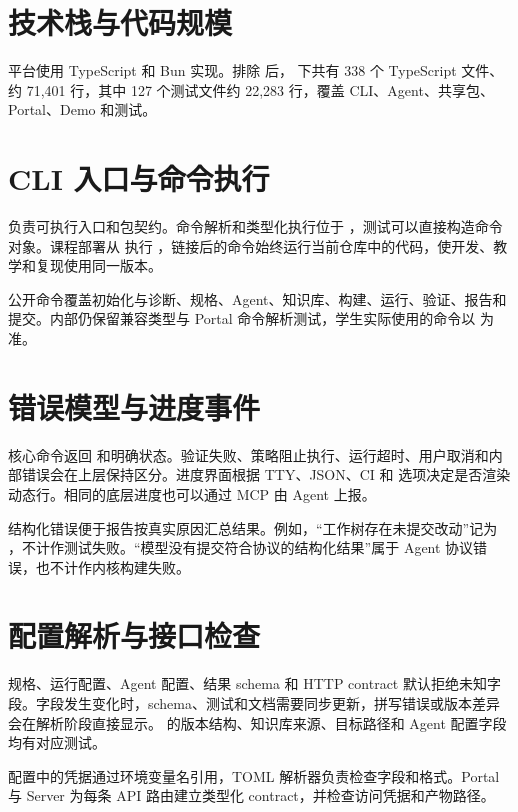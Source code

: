 \section{技术栈与代码规模}

平台使用 TypeScript 和 Bun 实现。排除  后， 下共有 338 个 TypeScript 文件、约 71,401 行，其中 127 个测试文件约 22,283 行，覆盖 CLI、Agent、共享包、Portal、Demo 和测试。

\section{CLI 入口与命令执行}

 负责可执行入口和包契约。命令解析和类型化执行位于 ，测试可以直接构造命令对象。课程部署从  执行 ，链接后的命令始终运行当前仓库中的代码，使开发、教学和复现使用同一版本。

公开命令覆盖初始化与诊断、规格、Agent、知识库、构建、运行、验证、报告和提交。内部仍保留兼容类型与 Portal 命令解析测试，学生实际使用的命令以  为准。

\section{错误模型与进度事件}

核心命令返回  和明确状态。验证失败、策略阻止执行、运行超时、用户取消和内部错误会在上层保持区分。进度界面根据 TTY、JSON、CI 和  选项决定是否渲染动态行。相同的底层进度也可以通过 MCP  由 Agent 上报。

结构化错误便于报告按真实原因汇总结果。例如，``工作树存在未提交改动''记为 ，不计作测试失败。``模型没有提交符合协议的结构化结果''属于 Agent 协议错误，也不计作内核构建失败。

\section{配置解析与接口检查}

规格、运行配置、Agent 配置、结果 schema 和 HTTP contract 默认拒绝未知字段。字段发生变化时，schema、测试和文档需要同步更新，拼写错误或版本差异会在解析阶段直接显示。 的版本结构、知识库来源、目标路径和 Agent 配置字段均有对应测试。

配置中的凭据通过环境变量名引用，TOML 解析器负责检查字段和格式。Portal 与 Server 为每条 API 路由建立类型化 contract，并检查访问凭据和产物路径。

